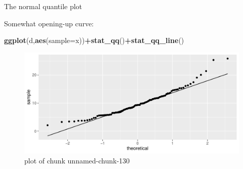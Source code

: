 \documentclass[ignorenonframetext,]{beamer}
\newenvironment{Shaded}{\begin{snugshade}}{\end{snugshade}}
\newcommand{\DataTypeTok}[1]{\textcolor[rgb]{0.13,0.29,0.53}{#1}}
\newcommand{\KeywordTok}[1]{\textcolor[rgb]{0.13,0.29,0.53}{\textbf{#1}}}
\newcommand{\NormalTok}[1]{#1}
\newcommand{\OperatorTok}[1]{\textcolor[rgb]{0.81,0.36,0.00}{\textbf{#1}}}
\begin{document}
\begin{frame}[fragile]{The normal quantile plot}
\protect\hypertarget{the-normal-quantile-plot-3}{}

Somewhat opening-up curve:

\begin{Shaded}
\begin{Highlighting}[]
\KeywordTok{ggplot}\NormalTok{(d,}\KeywordTok{aes}\NormalTok{(}\DataTypeTok{sample=}\NormalTok{x))}\OperatorTok{+}\KeywordTok{stat_qq}\NormalTok{()}\OperatorTok{+}\KeywordTok{stat_qq_line}\NormalTok{()}
\end{Highlighting}
\end{Shaded}

\begin{figure}
\centering
\includegraphics{figure/unnamed-chunk-130-1.pdf}
\caption{plot of chunk unnamed-chunk-130}
\end{figure}

\end{frame}
\end{document}
